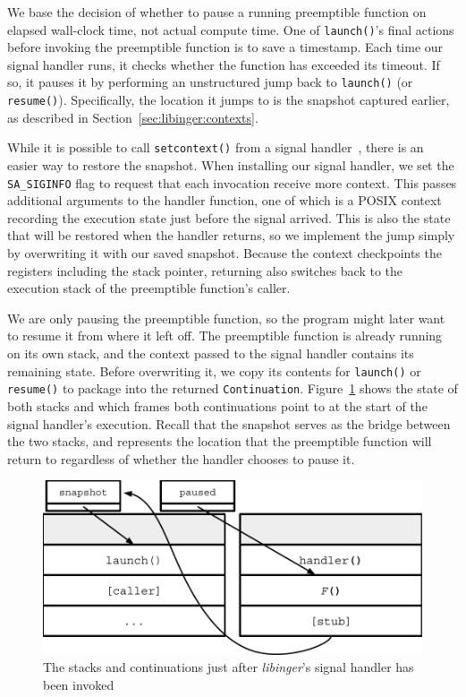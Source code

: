 We base the decision of whether to pause a running preemptible function on elapsed
wall-clock time, not actual compute time.  One of \texttt{launch()}'s final actions
before invoking the preemptible function is to save a timestamp.  Each time our
signal handler runs, it checks whether the function has exceeded its timeout.  If so,
it pauses it by performing an unstructured jump back to \texttt{launch()} (or
\texttt{resume()}).  Specifically, the location it jumps to is the snapshot captured
earlier, as described in Section~\ref{sec:libinger:contexts}.

While it is possible to call \texttt{setcontext()} from a signal
handler~\cite{getcontext-manpage}, there is an easier way to restore the snapshot.
When installing our signal handler, we set the \texttt{SA\_SIGINFO} flag to request
that each invocation receive more context.  This passes additional arguments to
the handler function, one of which is a POSIX context recording the execution state
just before the signal arrived.  This is also the state that will be restored when
the handler returns, so we implement the jump simply by overwriting it with our saved
snapshot.  Because the context checkpoints the registers including the stack pointer,
returning also switches back to the execution stack of the preemptible function's
caller.

We are only pausing the preemptible function, so the program might later want to
resume it from where it left off.  The preemptible function is already running on its
own stack, and the context passed to the signal handler contains its remaining state.
Before overwriting it, we copy its contents for \texttt{launch()} or
\texttt{resume()} to package into the returned \texttt{Continuation}.
Figure~\ref{fig:twostackscontinuations} shows the state of both stacks and which
frames both continuations point to at the start of the signal handler's execution.
Recall that the snapshot serves as the bridge between the two stacks, and represents
the location that the preemptible function will return to regardless of whether the
handler chooses to pause it.

\begin{figure}
\includegraphics[width=\columnwidth]{figs/twostacks_twocontinuations}
\caption{The stacks and continuations just after \textit{libinger}'s signal handler has been invoked}
\label{fig:twostackscontinuations}
\end{figure}


